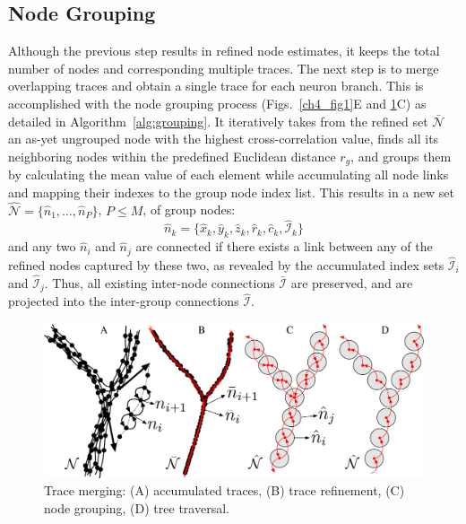 \subsection{Node Grouping}
\label{subsec:node-grouping}
Although the previous step results in refined node estimates, it keeps the total number of nodes and corresponding multiple traces. The next step is to merge overlapping traces and obtain a single trace for each neuron branch. This is accomplished with the node grouping process (Figs.~\ref{ch4_fig1}E and \ref{ch4_fig4}C) as detailed in Algorithm~\ref{alg:grouping}. It iteratively takes from the refined set $\bar{\mathcal{N}}$ an as-yet ungrouped node with the highest cross-correlation value, finds all its neighboring nodes within the predefined Euclidean distance $r_g$, and groups them by calculating the mean value of each element while accumulating all node links and mapping their indexes to the group node index list. This results in a new set $\hat{\mathcal{N}} = \lbrace \hat{n}_1,\dots,\hat{n}_P \rbrace$, $P \leq M$, of group nodes:
\begin{equation}
\label{eq:hat_n_k}
\hat{n}_k=\lbrace\hat{x}_k, \hat{y}_k, \hat{z}_k, \hat{r}_k, \hat{c}_k, \hat{\mathcal{I}}_k\rbrace
\end{equation}
and any two $\hat{n}_i$ and $\hat{n}_j$ are connected if there exists a link between any of the refined nodes captured by these two, as revealed by the accumulated index sets $\hat{\mathcal{I}}_i$ and $\hat{\mathcal{I}}_j$. Thus, all existing inter-node connections $\bar{\mathcal{I}}$ are preserved, and are projected into the inter-group connections $\hat{\mathcal{I}}$.
\begin{figure}
	\centering
	\includegraphics[width=0.7\columnwidth]{fig4}
	\caption{Trace merging: (A) accumulated traces, (B) trace refinement, (C) node grouping, (D) tree traversal.}
	\label{ch4_fig4}
\end{figure}
